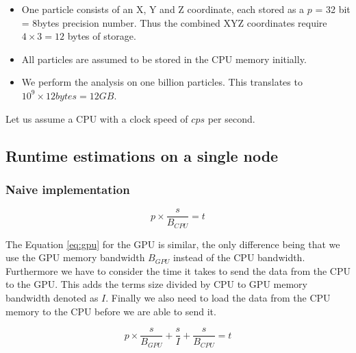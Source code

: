 \documentclass[]{article}
\begin{document}
\begin{itemize}
	\item
	One particle consists of an X, Y and Z coordinate, each stored as a $p$ = 32 bit = 8bytes precision number. Thus the combined  XYZ coordinates require $4\times3 = 12$ bytes of storage.
	
	\item 
	All particles are assumed to be stored in the CPU memory initially.
	
	\item
	We perform the analysis on one billion particles. This translates to $10^9 \times  12 bytes = 12 GB$.
	
\end{itemize}


Let us assume a CPU with a clock speed of $cps$ per second. 

\subsection{Runtime estimations on a single node}


\subsubsection{Naive implementation}

\begin{center}
	\begin{equation}
			p \times \frac{ s }{B_{CPU}} = t
			\label{eq:cpu}
	\end{equation}
\end{center}

\vspace{5mm}


The Equation \ref{eq:gpu} for the GPU is similar, the only difference being that we use the GPU memory bandwidth $B_{GPU}$ instead of the CPU bandwidth. Furthermore we have to consider the time it takes to send the data from the CPU to the GPU. This adds the terms size divided by CPU to GPU memory bandwidth denoted as $I$. Finally we also need to load the data from the CPU memory to the CPU before we are able to send it. 

\begin{center}
	\begin{equation}
		p \times \frac{s}{B_{GPU}} + \frac{s}{I}  + \frac{s}{B_{CPU}}= t
		\label{eq:gpu}
	\end{equation}
\end{center}
\end{document}
